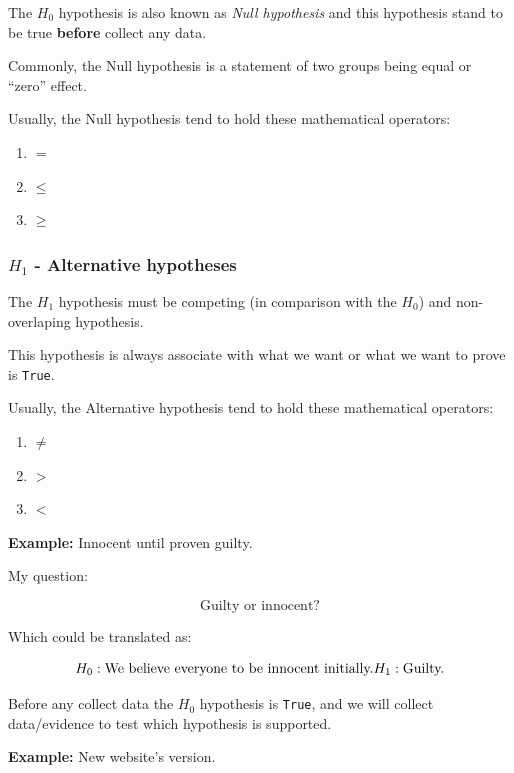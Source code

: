 \documentclass[]{book}
\providecommand{\tightlist}{%
  \setlength{\itemsep}{0pt}\setlength{\parskip}{0pt}}
\begin{document}
The \(H_0\) hypothesis is also known as \emph{Null hypothesis} and this
hypothesis stand to be true \textbf{before} collect any data.

Commonly, the Null hypothesis is a statement of two groups being equal
or ``zero'' effect.

Usually, the Null hypothesis tend to hold these mathematical operators:

\begin{enumerate}
\def\labelenumi{\arabic{enumi}.}
\tightlist
\item
  \(=\)
\item
  \(\leq\)
\item
  \(\geq\)
\end{enumerate}

\subsubsection*{\texorpdfstring{\(H_1\) - Alternative
hypotheses}{H\_1 - Alternative hypotheses}}\label{h_1---alternative-hypotheses}

The \(H_1\) hypothesis must be competing (in comparison with the
\(H_0\)) and non-overlaping hypothesis.

This hypothesis is always associate with what we want or what we want to
prove is \texttt{True}.

Usually, the Alternative hypothesis tend to hold these mathematical
operators:

\begin{enumerate}
\def\labelenumi{\arabic{enumi}.}
\tightlist
\item
  \(\neq\)
\item
  \(>\)
\item
  \(<\)
\end{enumerate}

\textbf{Example:} Innocent until proven guilty.

My question:

\[ \text{Guilty or innocent?} \]

Which could be translated as:

\[H_0: \text{We believe everyone to be innocent initially.} \\
  H_1:\text{Guilty.} \]

Before any collect data the \(H_0\) hypothesis is \texttt{True}, and we
will collect data/evidence to test which hypothesis is supported.

\textbf{Example:} New website's version.
\end{document}
